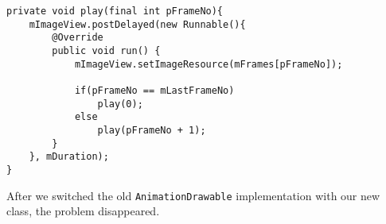 \begin{lstlisting}[caption={Our method for playing an animation based on a set of images.},label={lst:methodPlay}]
private void play(final int pFrameNo){
    mImageView.postDelayed(new Runnable(){
        @Override
        public void run() {                    
            mImageView.setImageResource(mFrames[pFrameNo]);

            if(pFrameNo == mLastFrameNo)
                play(0);
            else
                play(pFrameNo + 1);
        }
    }, mDuration);
}        
\end{lstlisting}

After we switched the old \lstinline{AnimationDrawable} implementation with our new class, the problem disappeared.